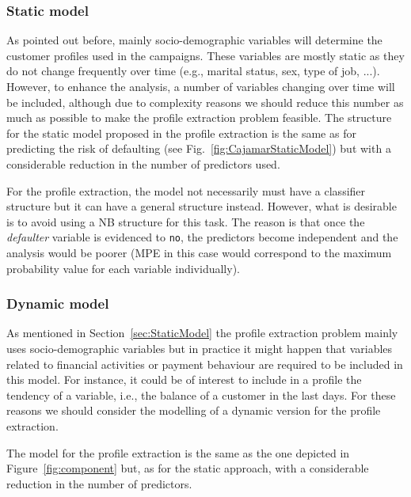 \subsubsection*{Static model}\label{sec:StaticModel}

As pointed out before, mainly socio-demographic variables will determine the customer profiles used in the campaigns. These variables are mostly static as they do not change frequently over time (e.g., marital status, sex, type of job, ...). However, to enhance the analysis, a number of  variables changing over time will be included, although due to complexity reasons we should reduce this number as much as possible to make the profile extraction problem feasible.
The structure for the static model proposed in the profile extraction is the same as for predicting the risk of defaulting (see Fig.~\ref{fig:CajamarStaticModel}) but with a considerable reduction in the number of predictors used. 

For the profile extraction, the model not necessarily must have a classifier structure but it can have a general structure instead. However, what is desirable is to avoid using a NB structure for this task. The reason is that once the \emph{defaulter} variable is evidenced to \texttt{no}, the predictors become independent and the analysis would be poorer (MPE in this case would correspond to the maximum probability value for each variable individually).

\subsubsection*{Dynamic model}

As mentioned in Section~\ref{sec:StaticModel} the profile extraction problem mainly uses socio-demographic variables but in practice it might happen that variables related to financial activities or payment behaviour are required to be included in this model.  For instance, it could be of interest to include in a profile the tendency of a variable, i.e., the balance of a customer in the last days. For these reasons we should consider the modelling of a dynamic version for the profile extraction. 

The model for the profile extraction is the same as the one depicted in Figure~\ref{fig:component} but, as for the static approach, with a considerable reduction in the number of predictors. 
 
